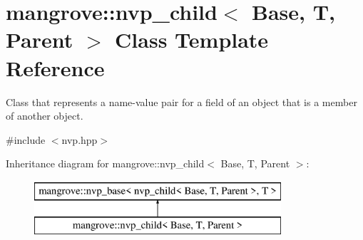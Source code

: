 \hypertarget{classmangrove_1_1nvp__child}{}\section{mangrove\+:\+:nvp\+\_\+child$<$ Base, T, Parent $>$ Class Template Reference}
\label{classmangrove_1_1nvp__child}


Class that represents a name-\/value pair for a field of an object that is a member of another object.  




{\ttfamily \#include $<$nvp.\+hpp$>$}

Inheritance diagram for mangrove\+:\+:nvp\+\_\+child$<$ Base, T, Parent $>$\+:\begin{figure}[H]
\begin{center}
\leavevmode
\includegraphics[height=2.000000cm]{classmangrove_1_1nvp__child}
\end{center}
\end{figure}
